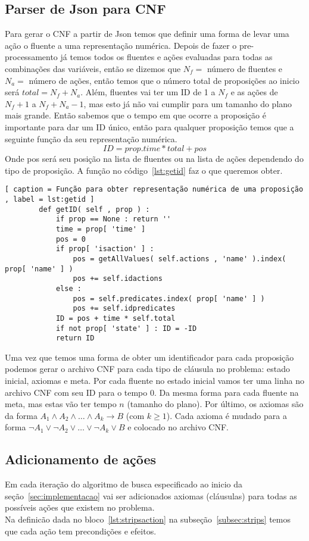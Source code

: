  \subsection{Parser de Json para CNF}
 \label{subsec:jsoncnf}
 	Para gerar o CNF a partir de Json temos que definir uma forma de levar uma ação o fluente a uma representação numérica. Depois de fazer o pre-processamento já temos todos os fluentes e ações evaluadas para todas as combinações das variáveis, então se dizemos que $N_f = $ número de fluentes e $N_a = $ número de ações, então temos que o número total de proposições ao inicio será $total = N_f + N_a$. Além, fluentes vai ter um ID de 1 a $N_f$ e as ações de $N_f + 1$ a $N_f + N_a - 1$, mas esto já não vai cumplir para um tamanho do plano mais grande. Então sabemos que o tempo em que ocorre a proposição é importante para dar um ID único, então para qualquer proposição temos que a seguinte função da seu representação numérica.
	\[
		ID = prop.time * total + pos
	\]
	Onde pos será seu posição na lista de fluentes ou na lista de ações dependendo do tipo de proposição. A função no código~\ref{lst:getid} faz o que queremos obter.
	\begin{lstlisting}[ caption = Função para obter representação numérica de uma proposição , label = lst:getid ]
		def getID( self , prop ) :
			if prop == None : return ''
			time = prop[ 'time' ]
			pos = 0
			if prop[ 'isaction' ] :
				pos = getAllValues( self.actions , 'name' ).index( prop[ 'name' ] )
				pos += self.idactions
			else :
				pos = self.predicates.index( prop[ 'name' ] )
				pos += self.idpredicates
			ID = pos + time * self.total
			if not prop[ 'state' ] : ID = -ID
			return ID
	\end{lstlisting}
	
	Uma vez que temos uma forma de obter um identificador para cada proposição podemos gerar o archivo CNF para cada tipo de cláusula no problema: estado inicial, axiomas e meta.
	Por cada fluente no estado inicial vamos ter uma linha no archivo CNF com seu ID para o tempo 0. Da mesma forma para cada fluente na meta, mas estas vão ter tempo $n$ (tamanho do plano).
	Por último, os axiomas são da forma $A_1 \land A_2 \land \ldots \land A_k \to B$ (com $k \geq 1$). Cada axioma é mudado para a forma $\lnot A_1 \lor \lnot A_2 \lor \ldots \lor \lnot A_k \lor B$ e colocado no archivo CNF.
	
\subsection{Adicionamento de ações}
\label{subsec:addaxioms}
	Em cada iteração do algoritmo de busca especificado ao inicio da seção~\ref{sec:implementacao} vai ser adicionados axiomas (cláusulas) para todas as possíveis ações que existem no problema.\\
	Na definicão dada no bloco~\ref{lst:stripsaction} na subseção~\ref{subsec:strips} temos que cada ação tem precondições e efeitos.
